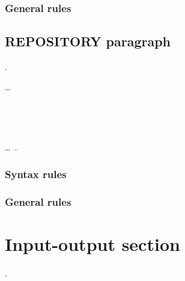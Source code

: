 \subsubsection{General rules}

\subsection{REPOSITORY paragraph}

\begin{syntax}
  .

  \begin{0-1}
    \begin{1=}
      \begin{1=}
        \begin{1=}
          \functionname
        \end{1=}\ldots \\

      \end{1=}
       \\

       \functionname
      \begin{0-1}
         \literal
      \end{0-1} \\

       \programname
      \begin{0-1}
         \literal
      \end{0-1}
    \end{1=}\ldots\ {}.
  \end{0-1}
\end{syntax}

\subsubsection{Syntax rules}

\subsubsection{General rules}

\section{Input-output section}

\begin{syntax}
  \begin{0-1}
     .
  \end{0-1}\newline
  \begin{0-1}
  \end{0-1}\newline
  \begin{0-1}
  \end{0-1}
\end{syntax}

